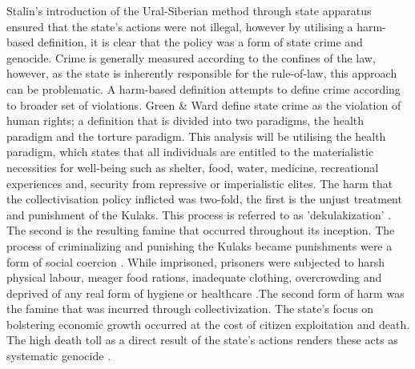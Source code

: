 \documentclass[11pt, a4paper,]{scrartcl}
\begin{document}
Stalin's introduction of the Ural-Siberian method through state apparatus ensured that the state's actions were not illegal, however by utilising a harm-based definition, it is clear that the policy was a form of state crime and genocide. Crime is generally measured according to the confines of the law, however, as the state is inherently responsible for the rule-of-law, this approach can be problematic. A harm-based definition attempts to define crime according to broader set of violations. Green \& Ward \citeyear{Green2000} define state crime as the violation of human rights; a definition that is divided into two paradigms, the health paradigm and the torture paradigm. This analysis will be utilising the health paradigm, which states that all individuals are entitled to the materialistic necessities for well-being such as shelter, food, water, medicine, recreational experiences and, security from repressive or imperialistic elites. The harm that the collectivisation policy inflicted was two-fold, the first is the unjust treatment and punishment of the Kulaks. This process is referred to as 'dekulakization' \cite{Meierhenrich}. The second is the resulting famine that occurred throughout its inception. The process of criminalizing and punishing the Kulaks became punishments were a form of social coercion \cite{Viola2005}. While imprisoned, prisoners were subjected to harsh physical labour, meager food rations, inadequate clothing, overcrowding and deprived of any real form of hygiene or healthcare \cite{khlevniuk2004}.The second form of harm was the famine that was incurred through collectivization. The state's focus on bolstering economic growth occurred at the cost of citizen exploitation and death. The high death toll as a direct result of the state's actions renders these acts as systematic genocide \cite{Meierhenrich}. \par
\end{document}

